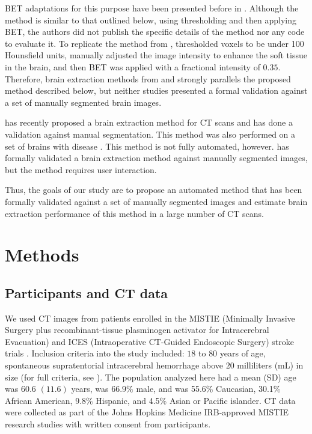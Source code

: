 BET adaptations for this purpose have been presented before in \citet{solomon_user-friendly_2007}.  Although the method is similar to that outlined below, using thresholding and then applying BET, the authors did not publish the specific details of the method nor any code to evaluate it.  To replicate the method from \citet{solomon_user-friendly_2007}, \citet{rorden_age-specific_2012} thresholded voxels to be under 100 Hounsfield units, manually adjusted the image intensity to enhance the soft tissue in the brain, and then BET was applied with a fractional intensity of $0.35$.  Therefore, brain extraction methods from \citet{rorden_age-specific_2012} and \citet{solomon_user-friendly_2007} strongly parallels the proposed method described below, but neither studies presented a formal validation against a set of manually segmented brain images.  

\citet{mandell2014volumetric1} has recently proposed a brain extraction method for CT scans and has done a validation against manual segmentation.  This method was also performed on a set of brains with disease \citep{mandell2014volumetric2, mandell2014volumetric3}.  This method is not fully automated, however.   \citet{mandell2014volumetric1} has formally validated a brain extraction method against manually segmented images, but the method requires user interaction.  

Thus, the goals of our study are to propose an automated method that has been formally validated against a set of manually segmented images and estimate brain extraction performance of this method in a large number of CT scans.





\section{Methods}
\subsection{ Participants and CT data}
We used CT images from patients enrolled in the MISTIE (Minimally Invasive Surgery plus recombinant-tissue plasminogen activator for Intracerebral Evacuation) and ICES (Intraoperative CT-Guided Endoscopic Surgery) stroke trials \citep{morgan_preliminary_2008}.  Inclusion criteria into the study included: $18$ to $80$ years of age, spontaneous supratentorial intracerebral hemorrhage above $20$ milliliters (mL) in size (for full criteria, see \citet{mould_minimally_2013}).  The population analyzed here had a mean (SD) age was $60.6$ $(11.6)$ years, was $66.9\%$ male, and was 55.6\% Caucasian, 30.1\% African American, 9.8\% Hispanic, and 4.5\% Asian or Pacific islander.  CT data were collected as part of the Johns Hopkins Medicine IRB-approved MISTIE research studies with written consent from participants.  


